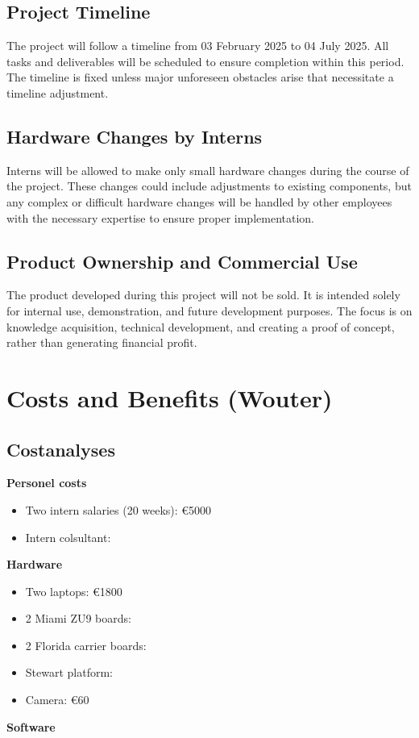\documentclass{article}
\begin{document}
\subsection{Project Timeline} The project will follow a timeline from 03
February 2025 to 04 July 2025. All tasks and deliverables will be scheduled to
ensure completion within this period. The timeline is fixed unless major
unforeseen obstacles arise that necessitate a timeline adjustment.

\subsection{Hardware Changes by Interns} Interns will be allowed to make only
small hardware changes during the course of the project. These changes could
include adjustments to existing components, but any complex or difficult
hardware changes will be handled by other employees with the necessary expertise
to ensure proper implementation.

\subsection{Product Ownership and Commercial Use}
The product developed during this project will not be sold.
It is intended solely for internal use, demonstration, and future development
purposes. The focus is on knowledge acquisition, technical development, and
creating a proof of concept, rather than generating financial profit.
\newpage

\section{Costs and Benefits (Wouter)}

\subsection{Costanalyses}
\textbf{Personel costs} \\
\begin{itemize}
    \item Two intern salaries (20 weeks): \euro 5000 
    \item Intern colsultant: %
\end{itemize}
\textbf{Hardware} \\ 

\begin{itemize} 

    \item Two laptops: \euro 1800
    \item 2 Miami ZU9 boards: 
    \item 2 Florida carrier boards:
    \item Stewart platform:
    \item Camera: \euro 60 
\end{itemize}
\textbf{Software}\\
\end{document}
